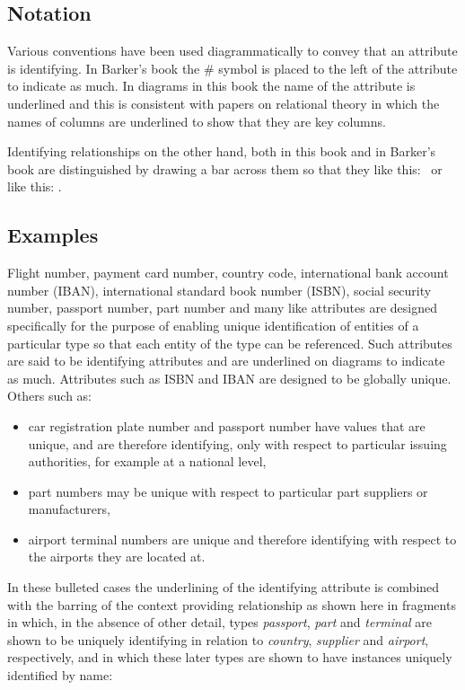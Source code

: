 \subsection{Notation}
 \mynote
Various conventions have been used diagrammatically to convey that an attribute is identifying. In Barker's book the \# symbol is placed to the left of the attribute to indicate as much. In diagrams in this book the name of the attribute is underlined and this is consistent with papers on relational theory in which  the names of columns are underlined to show that they are key columns.

\mynote Identifying relationships on the other hand, both in this book and in Barker's book 
are distinguished by drawing a bar across them so that they like this: \barkerEllisJ\ or like this: \barkerEllisK.



 
\subsection{Examples}
\mynote
Flight number, payment card number, country code, international bank account number (IBAN), 
international standard book number (ISBN), social security number, passport number, part number and many like attributes are designed specifically for the purpose of enabling unique identification of entities of a particular type so that each entity of the type can be referenced. Such attributes are said to be identifying attributes and are underlined 
on diagrams to indicate as much. Attributes 
such as ISBN and IBAN are designed to be globally unique.  
Others such as:
\begin{itemize}
\item
car registration plate number and passport number have values that are unique, and are therefore identifying, only with respect to particular issuing authorities, for example at a national level,
\item part numbers may be unique with respect to particular part suppliers or manufacturers,
\item airport terminal numbers are unique and therefore identifying with respect to the airports they are located at.
\end{itemize}
In these bulleted cases the underlining of the identifying attribute is combined with the barring of the context providing relationship as shown here in fragments in which, in the absence of other detail, types \textit{passport}, \textit{part} and \textit{terminal} are shown to be uniquely identifying  in relation
to \textit{country}, \textit{supplier} and \textit{airport}, respectively, 
and in which these later types are shown to have instances uniquely identified by name:

